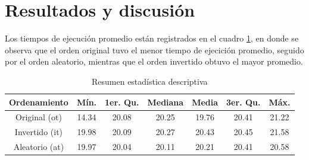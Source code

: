 \documentclass{article}
\begin{document}
\section{Resultados y discusión}
Los tiempos de ejecución promedio están registrados en el cuadro \ref{tabla}, en donde se observa que el orden original tuvo el menor tiempo de ejecición promedio, seguido por el orden aleatorio, mientras que el orden invertido obtuvo el mayor promedio. 
\begin{table}[h]
\begin{center}
\caption{Resumen estadística descriptiva}
\label{tabla}
\begin{tabular}{c c c c c c c}
\hline
\textbf{Ordenamiento}&\textbf{Mín.}&\textbf{1er. Qu.}&\textbf{Mediana}&\textbf{Media}&\textbf{3er. Qu.}&\textbf{Máx.}\\
\hline
Original (ot)&14.34&20.08&20.25&19.76&20.41&21.22\\
Invertido (it)&19.98&20.09&20.27&20.43&20.45&21.58\\
Aleatorio (at)&19.97&20.04&20.11&20.21&20.41&20.58\\
\hline
\end{tabular}
\end{center}
\end{table}
\end{document}
